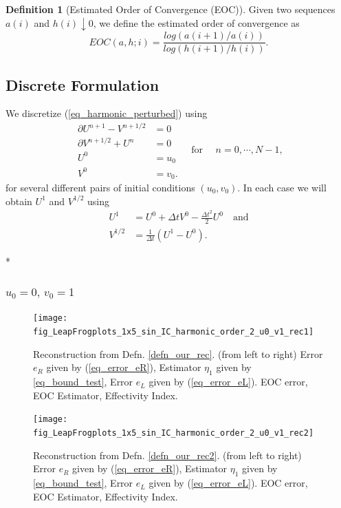 \documentclass[12pt,a4paper]{article}
\numberwithin{equation}{section}
\theoremstyle{definition}
\newcommand{\qp}[1]{\left(#1\right)}
\newtheorem{Defn}[subsection]{Definition}
\begin{document}
\begin{Defn}[Estimated Order of Convergence (EOC)] Given two sequences $a\qp{i}$ and $h\qp{i}\downarrow 0$, we define the estimated order of convergence as
\begin{equation}
EOC\qp{a,h;i} = \frac{log\qp{a\qp{i+1}/a\qp{i}}}{log\qp{h\qp{i+1}/h\qp{i}}}.
\end{equation}
\end{Defn}

\subsection{Discrete Formulation}\label{subsec_disc_form}
We discretize (\ref{eq_harmonic_perturbed}) using
\begin{equation}
\begin{aligned}
\partial U^{n+1} - V^{n+1/2} &= 0\\
\partial V^{n+1/2} +U^n &= 0\\
U^0 & =u_0\\
V^0 &=v_0.
\end{aligned}
\quad \text{for } \quad n= 0,\cdots, N-1,
\end{equation}
for several different pairs of initial conditions $\qp{u_0, v_0}$.  In each case we will obtain  $U^1$ and $V^{1/2}$ using
\begin{equation}
\begin{aligned}
U^1&=U^0+\Delta t V^0 -\frac{\Delta t^2}{2}U^0\quad\text{and}\\
V^{1/2} &= \frac{1}{\Delta t}\qp{U^1-U^0}.
\end{aligned}
\end{equation}


\/*
\subsubsection{$u_0=0,\, v_0=1$}
\begin{figure}[H]
	\hspace{-3cm}
	\texttt{[image: fig\_LeapFrogplots\_1x5\_sin\_IC\_harmonic\_order\_2\_u0\_v1\_rec1]}	
	\caption{Reconstruction from Defn. \ref{defn_our_rec}. (from left to right) Error $e_R$ given by (\ref{eq_error_eR}), Estimator $\eta_1$ given by \ref{eq_bound_test}, Error $e_L$ given by  (\ref{eq_error_eL}). EOC error, EOC Estimator, Effectivity Index.}
	\label{fig_all_in_one_our_rec_1_u0_v1}
\end{figure}

\begin{figure}[H]
	\hspace{-3cm}
	\texttt{[image: fig\_LeapFrogplots\_1x5\_sin\_IC\_harmonic\_order\_2\_u0\_v1\_rec2]}	
	\caption{Reconstruction from Defn. \ref{defn_our_rec2}. (from left to right) Error $e_R$ given by (\ref{eq_error_eR}), Estimator $\eta_1$ given by \ref{eq_bound_test}, Error $e_L$ given by  (\ref{eq_error_eL}). EOC error, EOC Estimator, Effectivity Index.}
	\label{fig_all_in_one_our_rec_2_u0_v1}
\end{figure}
\end{document}
